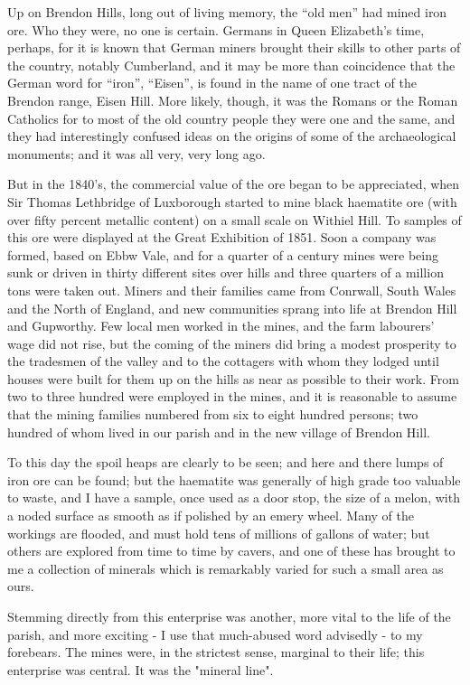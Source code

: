 Up on Brendon Hills, long out of living memory, the “old men” had mined iron ore. Who they were, no one is certain. Germans in Queen Elizabeth’s time, perhaps, for it is known that German miners brought their skills to other parts of the country, notably Cumberland, and it may be more than coincidence that the German word for “iron”, “Eisen”, is found in the name of one tract of the Brendon range, Eisen Hill.  More likely, though, it was the Romans or the Roman Catholics for to most of the old country people they were one and the same, and they had interestingly confused ideas on the origins of some of the archaeological monuments; and it was all very, very long ago.

But in the 1840’s, the commercial value of the ore began to be appreciated, when Sir Thomas Lethbridge of Luxborough started to mine black haematite ore (with over fifty percent metallic content) on a small scale on Withiel Hill. To samples of this ore were displayed at the Great Exhibition of 1851. Soon a company was formed, based on Ebbw Vale, and for a quarter of a century mines were being sunk or driven in thirty different sites over hills and three quarters of a million tons were taken out. Miners and their families came from Conrwall, South Wales and the North of England, and new communities sprang into life at Brendon Hill and Gupworthy. Few local men worked in the mines, and the farm labourers’ wage did not rise, but the coming of the miners did bring a modest prosperity to the tradesmen of the valley and to the cottagers with whom they lodged until houses were built for them up on the hills as near as possible to their work. From two to three hundred were employed in the mines, and it is reasonable to assume that the mining families numbered from six to eight hundred persons; two hundred of whom lived in our parish and in the new village of Brendon Hill.

To this day the spoil heaps are clearly to be seen; and here and there lumps of iron ore can be found; but the haematite was generally of high grade too valuable to waste, and I have a sample, once used as a door stop, the size of a melon, with a noded surface as smooth as if polished by an emery wheel. Many of the workings are flooded, and must hold tens of millions of gallons of water; but others are explored from time to time by cavers, and one of these has brought to me a collection of minerals which is remarkably varied for such a small area as ours.

Stemming directly from this enterprise was another, more vital to the life of the parish, and more exciting - I use that much-abused word advisedly - to my forebears. The mines were, in the strictest sense, marginal to their life; this enterprise was central. It was the "mineral line".

